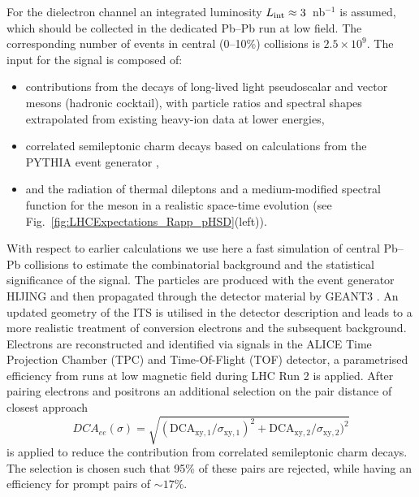 \documentclass[../report.tex]{subfiles}
\begin{document}
For the dielectron channel an integrated luminosity $L_{\rm int}\approx 3$~nb$^{−1}$ is assumed, which should be collected in the dedicated Pb--Pb run at low field. The corresponding number of events in central (0--10\%) collisions is $2.5 \times 10^{9}$.  
The input for the signal is composed of:
\begin{itemize}
\item contributions from the decays of long-lived light pseudoscalar and vector mesons (hadronic cocktail), with particle ratios and spectral shapes extrapolated from existing heavy-ion data at lower energies,
\item correlated semileptonic charm decays based on calculations from the PYTHIA event generator \cite{Sjostrand:2006za},
\item and the radiation of thermal dileptons and a medium-modified spectral function for the \Prho meson in a realistic space-time evolution (see Fig.~\ref{fig:LHCExpectations_Rapp_pHSD}(left)).
\end{itemize}
With respect to earlier calculations \cite{Abelevetal:2014cna,Abelevetal:2014dna,ALICE:2014qrd} we use here a fast simulation of central Pb--Pb collisions to estimate the combinatorial background and the statistical significance of the signal. The particles are produced with the event generator HIJING \cite{Wang:1991hta} and then propagated through the detector material by GEANT3 \cite{Brun:1994aa}. An updated geometry of the ITS is utilised in the detector description and leads to a more realistic treatment of conversion electrons and the subsequent background. 
Electrons are reconstructed and identified via signals in the ALICE Time Projection Chamber (TPC) and Time-Of-Flight (TOF) detector, a parametrised efficiency from runs at low magnetic field during LHC Run 2 is applied. After pairing electrons and positrons an additional selection on the pair distance of closest approach 
\begin{equation}
DCA_{ee}(\sigma)=\sqrt{(\mathrm{DCA}_{\mathrm{xy},1}/\sigma_{\mathrm{xy},1})^2+\mathrm{DCA}_{\mathrm{xy},2}/\sigma_{\mathrm{xy},2})^2}
\end{equation}
is applied to reduce the contribution from correlated semileptonic charm decays. The selection is chosen such that 95\% of these pairs are rejected, while having an efficiency for prompt pairs of $\sim17$\%.
\end{document}
